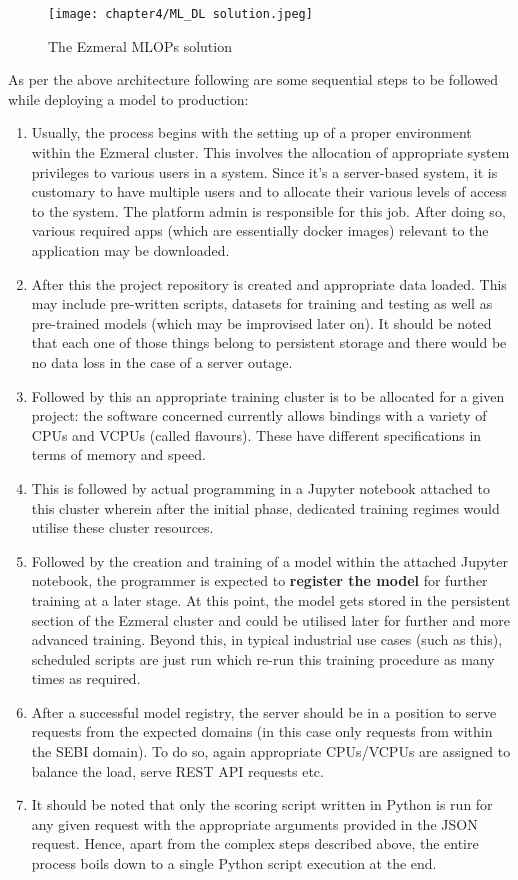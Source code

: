 \begin{figure}[h]
  \centering
  \texttt{[image: chapter4/ML\_DL solution.jpeg]}
  \caption{The Ezmeral MLOPs solution}
  \label{fig:ml_dl_sol}
\end{figure}

As per the above architecture following are some sequential steps to be followed while deploying a model to production: \cite{Chiang2020}

\begin{enumerate}
\item Usually, the process begins with the setting up of a proper environment within the Ezmeral cluster. This involves the allocation of appropriate system privileges to various users in a system. Since it’s a server-based system, it is customary to have multiple users and to allocate their various levels of access to the system. The platform admin is responsible for this job. After doing so, various required apps (which are essentially docker images) relevant to the application may be downloaded.
\item After this the project repository is created and appropriate data loaded. This may include pre-written scripts, datasets for training and testing as well as pre-trained models (which may be improvised later on). It should be noted that each one of those things belong to persistent storage and there would be no data loss in the case of a server outage.
\item Followed by this an appropriate training cluster is to be allocated for a given project: the software concerned currently allows bindings with a variety of CPUs and VCPUs (called flavours). These have different specifications in terms of memory and speed.
\item  This is followed by actual programming in a Jupyter notebook attached to this cluster wherein after the initial phase, dedicated training regimes would utilise these cluster resources.
\item  Followed by the creation and training of a model within the attached Jupyter notebook, the programmer is expected to \textbf{register the model} for further training at a later stage. At this point, the model gets stored in the persistent section of the Ezmeral cluster and could be utilised later for further and more advanced training. Beyond this, in typical industrial use cases (such as this), scheduled scripts are just run which re-run this training procedure as many times as required.
\item  After a successful model registry, the server should be in a position to serve requests from the expected domains (in this case only requests from within the SEBI domain). To do so, again appropriate CPUs/VCPUs are assigned to balance the load, serve REST API requests etc.
\item It should be noted that only the scoring script written in Python is run for any given request with the appropriate arguments provided in the JSON request. Hence, apart from the complex steps described above, the entire process boils down to a single Python script execution at the end. \par


\end{enumerate}
